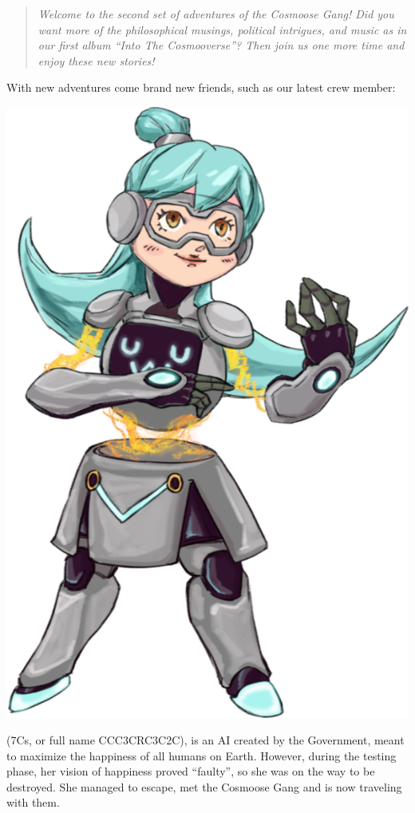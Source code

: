 

\begin{abstract}
\noindent
\emph{Welcome to the second set of adventures of the Cosmoose Gang! Did you want more of the philosophical musings, political intrigues, and music as in our first album ``Into The Cosmooverse''? Then join us one more time and enjoy these new stories!}
\end{abstract}

With new adventures come brand new friends, such as our latest crew member:\\

\begin{minipage}{0.3\textwidth}
\includegraphics[width=\textwidth]{Assets/sevenseas}
\end{minipage}
\begin{minipage}{0.7\textwidth}
 (7Cs, or full name CCC3CRC3C2C), is an AI created by the Government, meant to maximize the happiness of all humans on Earth. However, during the testing phase, her vision of happiness proved ``faulty'', so she was on the way to be destroyed. She managed to escape, met the Cosmoose Gang and is now traveling with them.\\
\hfill 
\end{minipage}
\vspace{.3cm}

